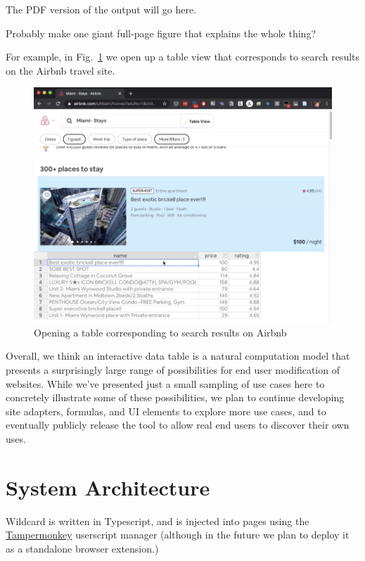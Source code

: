 \documentclass[english,submission]{programming}
\begin{document}
The PDF version of the output will go here.

Probably make one giant full-page figure that explains the whole thing?

For example, in Fig.~\ref{fig:table} we open up a table view that
corresponds to search results on the Airbnb travel site.

\begin{figure}
\hypertarget{fig:table}{%
\centering
\includegraphics{media/opentable.png}
\caption{Opening a table corresponding to search results on
Airbnb}\label{fig:table}
}
\end{figure}

Overall, we think an interactive data table is a natural computation
model that presents a surprisingly large range of possibilities for end
user modification of websites. While we've presented just a small
sampling of use cases here to concretely illustrate some of these
possibilities, we plan to continue developing site adapters, formulas,
and UI elements to explore more use cases, and to eventually publicly
release the tool to allow real end users to discover their own uses.

\hypertarget{system-architecture}{%
\section{System Architecture}\label{system-architecture}}

Wildcard is written in Typescript, and is injected into pages using the
\href{https://www.tampermonkey.net/}{Tampermonkey} userscript manager
(although in the future we plan to deploy it as a standalone browser
extension.)
\end{document}
